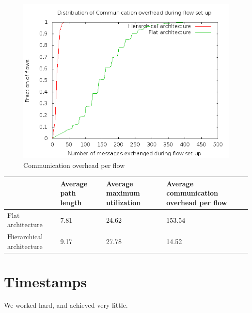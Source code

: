 \documentclass[10pt, twocolumn]{article}
\begin{document}
\begin{figure}[h]
\includegraphics[scale=0.3]{msg}
\caption{Communication overhead per flow}
\label{fig:msg}
\end{figure}


\begin{table}
\centering
\begin{tabular}{| L{5cm} | L{3cm} | L{3cm} | L{5cm} |}
\hline
& {Average path length} & {Average maximum utilization} & {Average communication overhead per flow} \\ \hline
Flat architecture & 7.81 & 24.62 & 153.54 \\ \hline
Hierarchical architecture & 9.17 & 27.78 & 14.52 \\ \hline
\end{tabular}
\end{table}%



\section{Timestamps}
\label{sec:timestamps}
We worked hard, and achieved very little.
\end{document}
